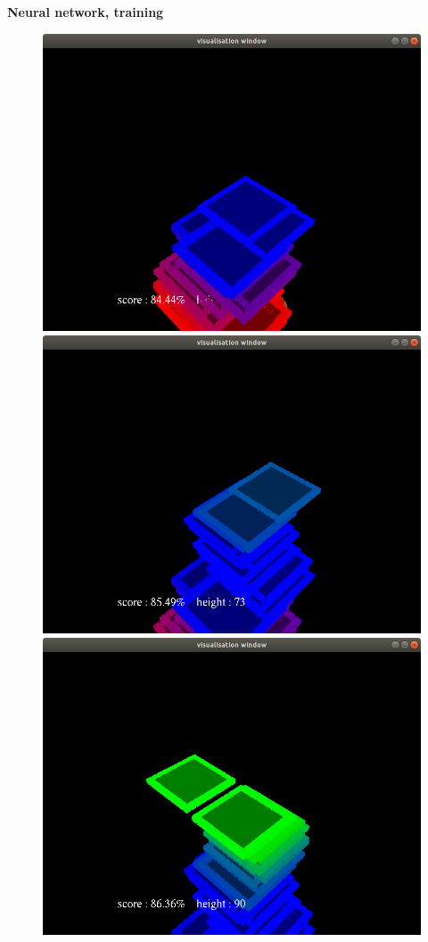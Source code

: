 \documentclass[xcolor=dvipsnames]{beamer}
\begin{document}
\begin{frame}{\bf Neural network, training}
\begin{minipage}{.5\textwidth}
\begin{figure}[htbp]
  \includegraphics[scale=0.07]{tr_04.png}
  \includegraphics[scale=0.07]{tr_05.png}
  \includegraphics[scale=0.07]{tr_06.png}
\end{figure}


\end{minipage}
\end{frame}
\end{document}
